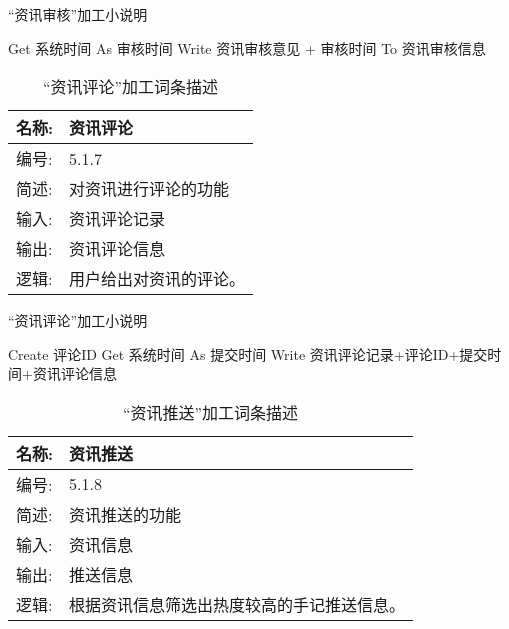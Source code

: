 \begin{algorithm}[H]
    \renewcommand{\thealgorithm}{}
    \caption{“资讯审核”加工小说明} 
    \label{alg3} 
    \begin{algorithmic}[1]
        \STATE Get 系统时间 As 审核时间
        \STATE Write 资讯审核意见 + 审核时间 To 资讯审核信息
    \end{algorithmic} 
\end{algorithm}

\begin{table}[H]  
\caption{“资讯评论”加工词条描述}  
\begin{center}  
    \begin{tabular}{l p{11cm}} 
        \hline
        \quad 名称:  &  资讯评论 \\
        \hline
        \quad 编号:  & 5.1.7 \\
        \hline
        \quad 简述:  & 对资讯进行评论的功能 \\
        \hline
        \quad 输入:  & 资讯评论记录 \\
        \hline
        \quad 输出:  & 资讯评论信息 \\
        \hline
        \quad 逻辑:  & 用户给出对资讯的评论。 \\
        \hline
    \end{tabular}
    \label{tab1}
\end{center}
\end{table}

\begin{algorithm}[H]
    \renewcommand{\thealgorithm}{}
    \caption{“资讯评论”加工小说明} 
    \label{alg3} 
    \begin{algorithmic}[1]
        \STATE Create 评论ID
        \STATE Get 系统时间 As 提交时间
        \STATE Write 资讯评论记录+评论ID+提交时间+资讯评论信息
    \end{algorithmic} 
\end{algorithm}

\begin{table}[H]  
\caption{“资讯推送”加工词条描述}  
\begin{center}  
    \begin{tabular}{l p{11cm}} 
        \hline
        \quad 名称:  & 资讯推送 \\
        \hline
        \quad 编号:  & 5.1.8 \\
        \hline
        \quad 简述:  & 资讯推送的功能 \\
        \hline
        \quad 输入:  & 资讯信息 \\
        \hline
        \quad 输出:  & 推送信息 \\
        \hline
        \quad 逻辑:  & 根据资讯信息筛选出热度较高的手记推送信息。 \\
        \hline
    \end{tabular}
    \label{tab1}
\end{center}
\end{table}

